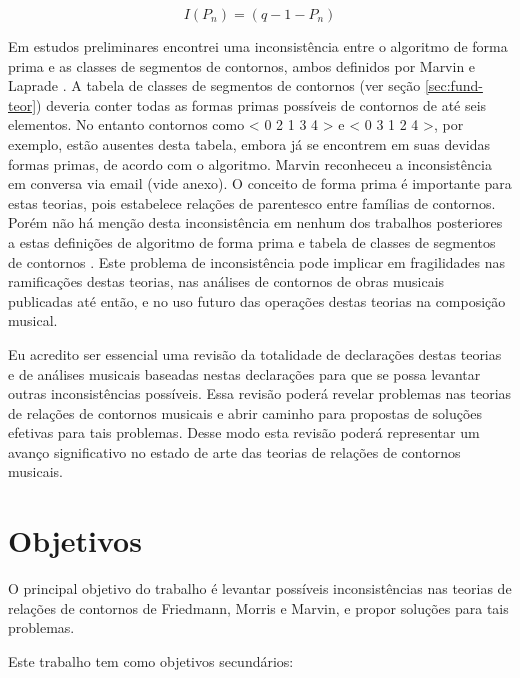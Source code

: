 \documentclass[12pt]{article}
\begin{document}
\begin{equation}
  \label{eq:1}
  I(P_n) = (q − 1 − P_n)
\end{equation}

Em estudos preliminares encontrei uma inconsistência entre o algoritmo
de forma prima e as classes de segmentos de contornos, ambos definidos
por Marvin e Laprade \cite{marvin.ea87:relating}. A tabela de classes
de segmentos de contornos (ver seção \ref{sec:fund-teor}) deveria
conter todas as formas primas possíveis de contornos de até seis
elementos. No entanto contornos como < 0 2 1 3 4 > e < 0 3 1 2 4 >,
por exemplo, estão ausentes desta tabela, embora já se encontrem em
suas devidas formas primas, de acordo com o algoritmo. Marvin
reconheceu a inconsistência em conversa via email (vide anexo). O
conceito de forma prima é importante para estas teorias, pois
estabelece relações de parentesco entre famílias de contornos. Porém
não há menção desta inconsistência em nenhum dos trabalhos posteriores
a estas definições de algoritmo de forma prima e tabela de classes de
segmentos de contornos
\cite{polansky.ea92:possible,clifford95:contour,quinn97:fuzzy,beard03:contour,bor09:contour,schultz08:melodic,schultz09:diachronic}. Este
problema de inconsistência pode implicar em fragilidades nas
ramificações destas teorias, nas análises de contornos de obras
musicais publicadas até então, e no uso futuro das operações destas
teorias na composição musical.

Eu acredito ser essencial uma revisão da totalidade de declarações
destas teorias e de análises musicais baseadas nestas declarações para
que se possa levantar outras inconsistências possíveis. Essa revisão
poderá revelar problemas nas teorias de relações de contornos musicais
e abrir caminho para propostas de soluções efetivas para tais
problemas. Desse modo esta revisão poderá representar um avanço
significativo no estado de arte das teorias de relações de contornos
musicais.

\section{Objetivos}
\label{sec:objetivos}

O principal objetivo do trabalho é levantar possíveis inconsistências
nas teorias de relações de contornos de Friedmann, Morris e Marvin, e
propor soluções para tais problemas.

Este trabalho tem como objetivos secundários:
\end{document}
